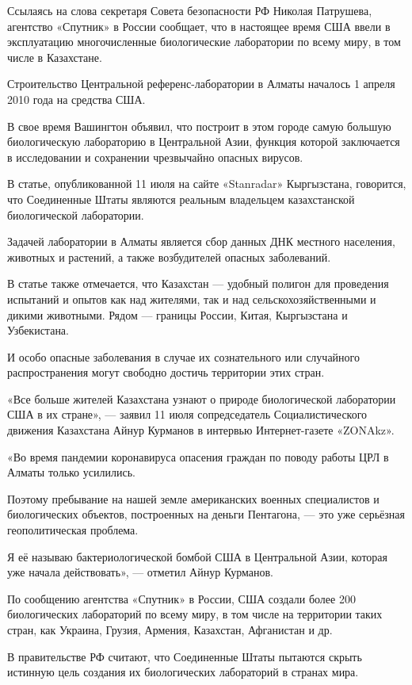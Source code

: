 Ссылаясь на слова секретаря Совета безопасности РФ Николая Патрушева, агентство
«Спутник» в России сообщает, что в настоящее время США ввели в эксплуатацию
многочисленные биологические лаборатории по всему миру, в том числе в
Казахстане.

Строительство Центральной референс-лаборатории в Алматы началось 1 апреля 2010
года на средства США.

В свое время Вашингтон объявил, что построит в этом городе самую большую
биологическую лабораторию в Центральной Азии, функция которой заключается в
исследовании и сохранении чрезвычайно опасных вирусов.

В статье, опубликованной 11 июля на сайте «Stanradar» Кыргызстана, говорится,
что Соединенные Штаты являются реальным владельцем казахстанской биологической
лаборатории.

Задачей лаборатории в Алматы является сбор данных ДНК местного населения,
животных и растений, а также возбудителей опасных заболеваний.

В статье также отмечается, что Казахстан --- удобный полигон для проведения
испытаний и опытов как над жителями, так и над сельскохозяйственными и дикими
животными. Рядом --- границы России, Китая, Кыргызстана и Узбекистана.

И особо опасные заболевания в случае их сознательного или случайного
распространения могут свободно достичь территории этих стран.

«Все больше жителей Казахстана узнают о природе биологической лаборатории США в
их стране», --- заявил 11 июля сопредседатель Социалистического движения
Казахстана Айнур Курманов в интервью Интернет-газете «ZONAkz».

«Во время пандемии коронавируса опасения граждан по поводу работы ЦРЛ в Алматы
только усилились.

Поэтому пребывание на нашей земле американских военных специалистов и
биологических объектов, построенных на деньги Пентагона, --- это уже серьёзная
геополитическая проблема.

Я её называю бактериологической бомбой США в Центральной Азии, которая уже
начала действовать», --- отметил Айнур Курманов.

По сообщению агентства «Спутник» в России, США создали более 200 биологических
лабораторий по всему миру, в том числе на территории таких стран, как Украина,
Грузия, Армения, Казахстан, Афганистан и др.

В правительстве РФ считают, что Соединенные Штаты пытаются скрыть истинную цель
создания их биологических лабораторий в странах мира.

